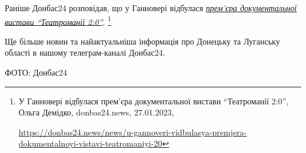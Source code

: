 Раніше Донбас24 розповідав, що у Ганновері відбулася \href{https://donbas24.news/news/u-gannoveri-vidbulasya-premjera-dokumentalnoyi-vistavi-teatromaniyi-20}{\emph{прем'єра документальної
вистави \enquote{Театроманії 2:0}}}.%
\footnote{У Ганновері відбулася прем'єра документальної вистави \enquote{Театроманії 2:0}, Ольга Демідко, donbas24.news, 27.01.2023, \par\url{https://donbas24.news/news/u-gannoveri-vidbulasya-premjera-dokumentalnoyi-vistavi-teatromaniyi-20}}

Ще більше новин та найактуальніша інформація про Донецьку та Луганську області
в нашому телеграм-каналі Донбас24.

ФОТО: Донбас24

